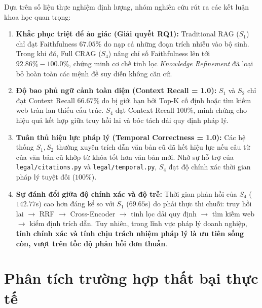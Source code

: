 Dựa trên số liệu thực nghiệm định lượng, nhóm nghiên cứu rút ra các kết luận khoa học quan trọng:
\begin{enumerate}
    \item \textbf{Khắc phục triệt để ảo giác (Giải quyết RQ1):} Traditional RAG ($S_1$) chỉ đạt Faithfulness $67.05\%$ do nạp cả những đoạn trích nhiễu vào bộ sinh. Trong khi đó, Full CRAG ($S_4$) nâng chỉ số Faithfulness lên tới \textbf{$92.86\% - 100.0\%$}, chứng minh cơ chế tinh lọc \textit{Knowledge Refinement} đã loại bỏ hoàn toàn các mệnh đề suy diễn không căn cứ.
    \item \textbf{Độ bao phủ ngữ cảnh toàn diện (Context Recall = 1.0):} $S_1$ và $S_2$ chỉ đạt Context Recall $66.67\%$ do bị giới hạn bởi Top-K cố định hoặc tìm kiếm web tràn lan thiếu cấu trúc. $S_4$ đạt Context Recall \textbf{$100\%$}, minh chứng cho hiệu quả kết hợp giữa truy hồi lai và bóc tách dải quy định pháp lý.
    \item \textbf{Tuân thủ hiệu lực pháp lý (Temporal Correctness = 1.0):} Các hệ thống $S_1, S_2$ thường xuyên trích dẫn văn bản cũ đã hết hiệu lực nếu câu từ của văn bản cũ khớp từ khóa tốt hơn văn bản mới. Nhờ sự hỗ trợ của \texttt{legal/citations.py} và \texttt{legal/temporal.py}, $S_4$ đạt độ chính xác thời gian pháp lý tuyệt đối ($100\%$).
    \item \textbf{Sự đánh đổi giữa độ chính xác và độ trễ:} Thời gian phản hồi của $S_4$ ($142.77$s) cao hơn đáng kể so với $S_1$ ($69.65$s) do phải thực thi chuỗi: truy hồi lai $\to$ RRF $\to$ Cross-Encoder $\to$ tinh lọc dải quy định $\to$ tìm kiếm web $\to$ kiểm định trích dẫn. Tuy nhiên, trong lĩnh vực pháp lý doanh nghiệp, \textbf{tính chính xác và tính chịu trách nhiệm pháp lý là ưu tiên sống còn, vượt trên tốc độ phản hồi đơn thuần}.
\end{enumerate}

\section{Phân tích trường hợp thất bại thực tế}

